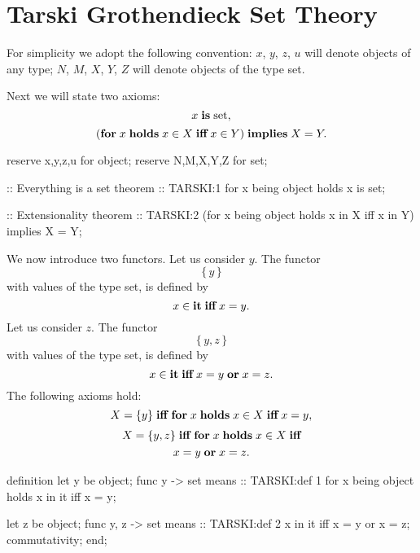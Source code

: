 \section{Tarski Grothendieck Set Theory}

\begin{paracol}{2}
For simplicity we adopt the following convention: $x$, $y$,
$z$, $u$ will denote objects of any type; $N$, $M$, $X$, $Y$, $Z$
will denote objects of the type set.
  
Next we will state two axioms:
\begin{equation}
x \mathrel{\textbf{is}} \textrm{set},
\end{equation}
\begin{equation}
(\mathrel{\textbf{for}} x\mathrel{\textbf{holds}} x\in X\mathrel{\textbf{iff}} x\in Y)\mathrel{\textbf{implies}} X=Y.
\end{equation}

\switchcolumn

\begin{mizar}
 reserve x,y,z,u for object;
 reserve N,M,X,Y,Z for set;

:: Everything is a set
theorem :: TARSKI:1
  for x being object holds x is set;

:: Extensionality
theorem :: TARSKI:2 
  (for x being object
   holds x in X iff x in Y)
  implies X = Y;
\end{mizar}

\switchcolumn*
\ensurevspace{5cm}

We now introduce two functors. Let us consider $y$. The functor
\[ \{\,y\,\} \]
with values of the type set, is defined by
\[ x\in\mathop{\textbf{it}} \mathrel{\textbf{iff}} x=y.\]
Let us consider $z$. The functor
\[ \{\,y,z\,\} \]
with values of the type set, is defined by
\[ x\in\mathop{\textbf{it}} \mathrel{\textbf{iff}} x=y \mathrel{\textbf{or}} x=z.\]
The following axioms hold:
\begin{equation}
X=\{y\} \mathrel{\textbf{iff}}\ \mathrel{\textbf{for}} x \mathrel{\textbf{holds}} x\in X \mathrel{\textbf{iff}} x=y,
\end{equation}
\begin{multline}
X=\{y,z\} \mathrel{\textbf{iff}}\ \mathrel{\textbf{for}} x\mathrel{\textbf{holds}} x\in X\mathrel{\textbf{iff}}\\
x=y\mathrel{\textbf{or}} x=z.
\end{multline}

\switchcolumn

\begin{mizar}
definition
  let y be object;
  func { y } -> set means
:: TARSKI:def 1
    for x being object
    holds x in it iff x = y;

  let z be object;
  func { y, z } -> set means
:: TARSKI:def 2
    x in it iff x = y or x = z;
  commutativity;
end;
\end{mizar}


\end{paracol}
